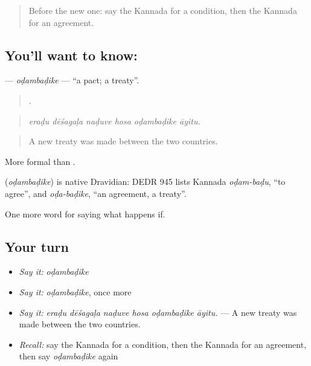 \label{lesson:KA-C411-odambadike}



\begin{quote}
Before the new one: say the Kannada for a condition, then the Kannada for an agreement.
\end{quote}

\subsection*{You'll want to know: }
\textbf{} — \emph{oḍambaḍike} — \textquotedblleft{}a pact; a treaty\textquotedblright{}.

\begin{quote}
     .
\end{quote}

\begin{quote}
\emph{eraḍu dēśagaḷa naḍuve hosa oḍambaḍike āyitu.}
\end{quote}

\begin{quote}
A new treaty was made between the two countries.
\end{quote}

More formal than .

\begin{cousinweb}
\textbf{} (\emph{oḍambaḍike}) is native Dravidian: DEDR 945 lists Kannada \emph{oḍam-baḍu}, \textquotedblleft{}to agree\textquotedblright{}, and \emph{oḍa-baḍike}, \textquotedblleft{}an agreement, a treaty\textquotedblright{}.
\end{cousinweb}

\begin{grammarlens}[title={What you've built}]
One more word for saying what happens if.
\end{grammarlens}

\subsection*{Your turn}
\begin{itemize}
\raggedright
  \item \emph{Say it:} \emph{oḍambaḍike}
  \item \emph{Say it:} \emph{oḍambaḍike}, once more
  \item \emph{Say it:} \emph{eraḍu dēśagaḷa naḍuve hosa oḍambaḍike āyitu.} — A new treaty was made between the two countries.
  \item \emph{Recall:} say the Kannada for a condition, then the Kannada for an agreement, then say \emph{oḍambaḍike} again
\end{itemize}

